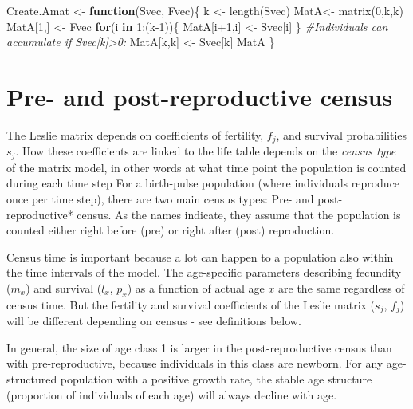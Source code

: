 \documentclass[
]{book}
\newenvironment{Shaded}{\begin{snugshade}}{\end{snugshade}}
\newcommand{\CommentTok}[1]{\textcolor[rgb]{0.56,0.35,0.01}{\textit{#1}}}
\newcommand{\ControlFlowTok}[1]{\textcolor[rgb]{0.13,0.29,0.53}{\textbf{#1}}}
\newcommand{\DecValTok}[1]{\textcolor[rgb]{0.00,0.00,0.81}{#1}}
\newcommand{\FunctionTok}[1]{\textcolor[rgb]{0.00,0.00,0.00}{#1}}
\newcommand{\NormalTok}[1]{#1}
\newcommand{\OtherTok}[1]{\textcolor[rgb]{0.56,0.35,0.01}{#1}}
\newcommand{\SpecialCharTok}[1]{\textcolor[rgb]{0.00,0.00,0.00}{#1}}
\begin{document}
\begin{Shaded}
\begin{Highlighting}[]
\NormalTok{Create.Amat }\OtherTok{\textless{}{-}} \ControlFlowTok{function}\NormalTok{(Svec, Fvec)\{}
\NormalTok{  k }\OtherTok{\textless{}{-}} \FunctionTok{length}\NormalTok{(Svec)}
\NormalTok{  MatA}\OtherTok{\textless{}{-}} \FunctionTok{matrix}\NormalTok{(}\DecValTok{0}\NormalTok{,k,k)}
\NormalTok{  MatA[}\DecValTok{1}\NormalTok{,] }\OtherTok{\textless{}{-}}\NormalTok{ Fvec }
  \ControlFlowTok{for}\NormalTok{(i }\ControlFlowTok{in} \DecValTok{1}\SpecialCharTok{:}\NormalTok{(k}\DecValTok{{-}1}\NormalTok{))\{}
\NormalTok{    MatA[i}\SpecialCharTok{+}\DecValTok{1}\NormalTok{,i] }\OtherTok{\textless{}{-}}\NormalTok{ Svec[i]}
\NormalTok{  \}}
  \CommentTok{\#Individuals can accumulate if Svec[k]\textgreater{}0:}
\NormalTok{  MatA[k,k] }\OtherTok{\textless{}{-}}\NormalTok{ Svec[k] }
\NormalTok{  MatA}
\NormalTok{  \}}
\end{Highlighting}
\end{Shaded}

\hypertarget{census}{%
\section{Pre- and post-reproductive census}\label{census}}

The Leslie matrix depends on coefficients of fertility, \(f_j\), and survival probabilities \(s_j\). How these coefficients are linked to the life table depends on the \emph{census type} of the matrix model, in other words at what time point the population is counted during each time step For a birth-pulse population (where individuals reproduce once per time step), there are two main census types: Pre- and post-reproductive* census. As the names indicate, they assume that the population is counted either right before (pre) or right after (post) reproduction.

Census time is important because a lot can happen to a population also within the time intervals of the model. The age-specific parameters describing fecundity (\(m_x\)) and survival (\(l_x\), \(p_x\)) as a function of actual age \(x\) are the same regardless of census time. But the fertility and survival coefficients of the Leslie matrix (\(s_j\), \(f_j\)) will be different depending on census - see definitions below.

In general, the size of age class 1 is larger in the post-reproductive census than with pre-reproductive, because individuals in this class are newborn. For any age-structured population with a positive growth rate, the stable age structure (proportion of individuals of each age) will always decline with age.
\end{document}
